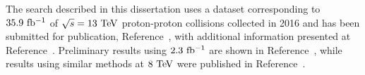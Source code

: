 The search described in this dissertation uses a dataset corresponding to $35.9~\mathrm{fb^{-1}}$ of $\sqrt{s} = 13~\mathrm{Te\kern -0.1em V}$ proton-proton collisions collected in 2016 and has been submitted for publication, Reference~\cite{Sirunyan:2017dhe}, with additional information presented at Reference~\cite{SUS-16-040_supp}.
Preliminary results using $2.3~\mathrm{fb^{-1}}$ are shown in Reference~\cite{CMS-PAS-SUS-16-013}, while results using similar methods at $8~\mathrm{Te\kern -0.1em V}$ were published in Reference~\cite{Khachatryan:2016iqn}.
